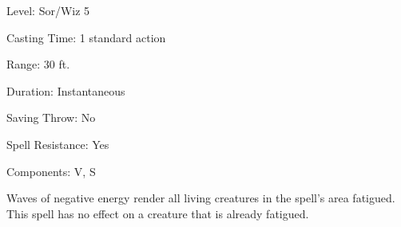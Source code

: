 
\begin{description*}
\item[Level:] Sor/Wiz 5
\item[Casting Time:] 1 standard action
\item[Range:] 30 ft.
\item[Duration:] Instantaneous
\item[Saving Throw:] No
\item[Spell Resistance:] Yes
\item[Components:] V, S
\end{description*}

Waves of negative energy render all living creatures in the spell's area fatigued.
This spell has no effect on a creature that is already fatigued.